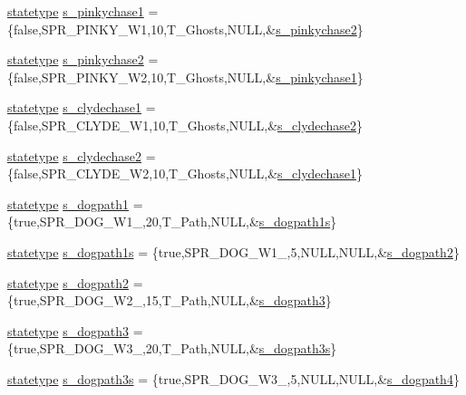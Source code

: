 \begin{DoxyCompactItemize}
\item 
\hyperlink{structstatestruct}{statetype} \hyperlink{WL__ACT2_8C_a1c2cbdc38e60af88a3cef64207116b7a}{s\_\-pinkychase1} = \{false,SPR\_\-PINKY\_\-W1,10,T\_\-Ghosts,NULL,\&\hyperlink{WL__ACT2_8C_adac339bd7db0954ac4ba36008de72e57}{s\_\-pinkychase2}\}
\item 
\hyperlink{structstatestruct}{statetype} \hyperlink{WL__ACT2_8C_adac339bd7db0954ac4ba36008de72e57}{s\_\-pinkychase2} = \{false,SPR\_\-PINKY\_\-W2,10,T\_\-Ghosts,NULL,\&\hyperlink{WL__ACT2_8C_a1c2cbdc38e60af88a3cef64207116b7a}{s\_\-pinkychase1}\}
\item 
\hyperlink{structstatestruct}{statetype} \hyperlink{WL__ACT2_8C_afdb3014d4251698197d83f989176804c}{s\_\-clydechase1} = \{false,SPR\_\-CLYDE\_\-W1,10,T\_\-Ghosts,NULL,\&\hyperlink{WL__ACT2_8C_a69193db0a2f4dee2e110b851f6fe2146}{s\_\-clydechase2}\}
\item 
\hyperlink{structstatestruct}{statetype} \hyperlink{WL__ACT2_8C_a69193db0a2f4dee2e110b851f6fe2146}{s\_\-clydechase2} = \{false,SPR\_\-CLYDE\_\-W2,10,T\_\-Ghosts,NULL,\&\hyperlink{WL__ACT2_8C_afdb3014d4251698197d83f989176804c}{s\_\-clydechase1}\}
\item 
\hyperlink{structstatestruct}{statetype} \hyperlink{WL__ACT2_8C_a2e8c7bd87e415805e988798640b496aa}{s\_\-dogpath1} = \{true,SPR\_\-DOG\_\-W1\_,20,T\_\-Path,NULL,\&\hyperlink{WL__ACT2_8C_a833365b947ba63ec1421667cc9b28198}{s\_\-dogpath1s}\}
\item 
\hyperlink{structstatestruct}{statetype} \hyperlink{WL__ACT2_8C_a833365b947ba63ec1421667cc9b28198}{s\_\-dogpath1s} = \{true,SPR\_\-DOG\_\-W1\_,5,NULL,NULL,\&\hyperlink{WL__ACT2_8C_aa842775dfccebc1a72425be58f7dd4b1}{s\_\-dogpath2}\}
\item 
\hyperlink{structstatestruct}{statetype} \hyperlink{WL__ACT2_8C_aa842775dfccebc1a72425be58f7dd4b1}{s\_\-dogpath2} = \{true,SPR\_\-DOG\_\-W2\_,15,T\_\-Path,NULL,\&\hyperlink{WL__ACT2_8C_ac49edfef8b2bf3f1bfcb8f6bdeeba025}{s\_\-dogpath3}\}
\item 
\hyperlink{structstatestruct}{statetype} \hyperlink{WL__ACT2_8C_ac49edfef8b2bf3f1bfcb8f6bdeeba025}{s\_\-dogpath3} = \{true,SPR\_\-DOG\_\-W3\_,20,T\_\-Path,NULL,\&\hyperlink{WL__ACT2_8C_a358e51ea36b7aaa63ab7269544e049f8}{s\_\-dogpath3s}\}
\item 
\hyperlink{structstatestruct}{statetype} \hyperlink{WL__ACT2_8C_a358e51ea36b7aaa63ab7269544e049f8}{s\_\-dogpath3s} = \{true,SPR\_\-DOG\_\-W3\_,5,NULL,NULL,\&\hyperlink{WL__ACT2_8C_a6f8e4e0307bf9bcad5cc99130e5ba475}{s\_\-dogpath4}\}
\item 

\end{DoxyCompactItemize}
